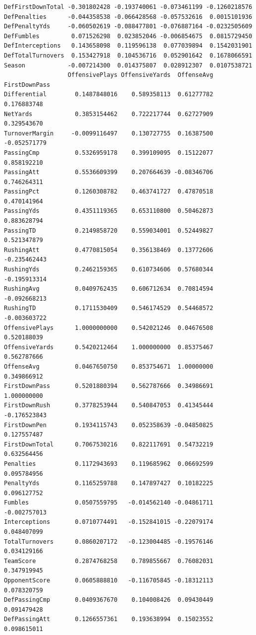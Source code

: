 \documentclass[
  letterpaper,
  DIV=11,
  numbers=noendperiod]{scrreprt}
\begin{document}
\begin{verbatim}
DefFirstDownTotal -0.301802428 -0.193740061 -0.073461199 -0.1260218576
DefPenalties      -0.044358538 -0.066428568 -0.057532616  0.0015101936
DefPenaltyYds     -0.060502619 -0.088477801 -0.076887164 -0.0232505609
DefFumbles         0.071526298  0.023852046 -0.006854675  0.0815729450
DefInterceptions   0.143658098  0.119596138  0.077039894  0.1542031901
DefTotalTurnovers  0.153427918  0.104536716  0.052901642  0.1678066591
Season            -0.007214300  0.014375807  0.028912307  0.0107538721
                  OffensivePlays OffensiveYards  OffenseAvg FirstDownPass
Differential        0.1487848016    0.589358113  0.61277782   0.176883748
NetYards            0.3853154462    0.722217744  0.62727909   0.329543670
TurnoverMargin     -0.0099116497    0.130727755  0.16387500  -0.052571779
PassingCmp          0.5326959178    0.399109095  0.15122077   0.858192210
PassingAtt          0.5536609399    0.207664639 -0.08346706   0.746264311
PassingPct          0.1260308782    0.463741727  0.47870518   0.470141964
PassingYds          0.4351119365    0.653110800  0.50462873   0.883628794
PassingTD           0.2149858720    0.559034001  0.52449827   0.521347879
RushingAtt          0.4770815054    0.356138469  0.13772606  -0.235462443
RushingYds          0.2462159365    0.610734606  0.57680344  -0.195913314
RushingAvg          0.0409762435    0.606712634  0.70814594  -0.092668213
RushingTD           0.1711530409    0.546174529  0.54468572  -0.003603722
OffensivePlays      1.0000000000    0.542021246  0.04676508   0.520188039
OffensiveYards      0.5420212464    1.000000000  0.85375467   0.562787666
OffenseAvg          0.0467650750    0.853754671  1.00000000   0.349866912
FirstDownPass       0.5201880394    0.562787666  0.34986691   1.000000000
FirstDownRush       0.3778253944    0.540847053  0.41345444  -0.176523843
FirstDownPen        0.1934115743    0.052358639 -0.04850825   0.127557487
FirstDownTotal      0.7067530216    0.822117691  0.54732219   0.632564456
Penalties           0.1172943693    0.119685962  0.06692599   0.095784956
PenaltyYds          0.1165259788    0.147897427  0.10182225   0.096127752
Fumbles             0.0507559795   -0.014562140 -0.04861711  -0.002757013
Interceptions       0.0710774491   -0.152841015 -0.22079174   0.048407099
TotalTurnovers      0.0860207172   -0.123004485 -0.19576146   0.034129166
TeamScore           0.2874768258    0.789855667  0.76082031   0.347919945
OpponentScore       0.0605888810   -0.116705845 -0.18312113   0.078320759
DefPassingCmp       0.0409367670    0.104008426  0.09430449   0.091479428
DefPassingAtt       0.1266557361    0.193638994  0.15023552   0.098615011

\end{verbatim}
\end{document}
